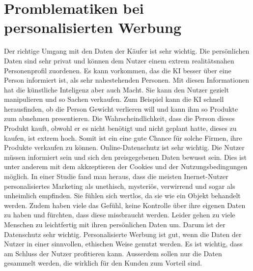 \documentclass{article}
\begin{document}
\section{Promblematiken bei personalisierten Werbung}

Der richtige Umgang mit den Daten der Käufer ist sehr wichtig. Die persönlichen Daten sind sehr privat und können dem Nutzer einem extrem realitätsnahen Personenprofil zuordenen. Es kann vorkommen, das die KI besser über eine Person informiert ist, als sehr nahestehenden Personen. Mit diesen Informationen hat die künstliche Inteligenz aber auch Macht. Sie kann den Nutzer gezielt manipulieren und so Sachen verkaufen. Zum Beispiel kann die KI schnell herausfinden, ob die Person Gewicht verlieren will und kann ihm so Produkte zum abnehmen presentieren. Die Wahrscheindlichkeit, dass die Person dieses Produkt kauft, obwohl er es nicht benötigt und nicht geplant hatte, dieses zu kaufen, ist extrem hoch. Somit ist ein eine gute Chance für solche Firmen, ihre Produkte verkaufen zu können. Online-Datenschutz ist sehr wichtig. Die Nutzer müssen informiert sein und sich den preisgegebenen Daten bewusst sein. Dies ist unter anderem mit dem akkzeptieren der Cookies und der Nutzungsbedingungen möglich. In einer Studie fand man heraus, dass die meisten Inernet-Nutzer personalisiertes Marketing als unethisch, mysteriös, verwirrend und sogar als unheimlich empfinden. Sie fühlen sich wertlos, da sie wie ein Objekt behandelt werden. Zudem haben viele das Gefühl, keine Kontrolle über ihre eigenen Daten zu haben und fürchten, dass diese missbraucht werden. Leider gehen zu viele Menschen zu leichtfertig mit ihren persönlichen Daten um. Darum ist der Datenschutz sehr wichtig. 
Personalisierte Werbung ist gut, wenn die Daten der Nutzer in einer sinnvollen, ethischen Weise genutzt werden. Es ist wichtig, dass am Schluss der Nutzer profitieren kann. Ausserdem sollen nur die Daten gesammelt werden, die wirklich für den Kunden zum Vorteil sind. 

 
 
 
  


\printbibliography
\end{document}
